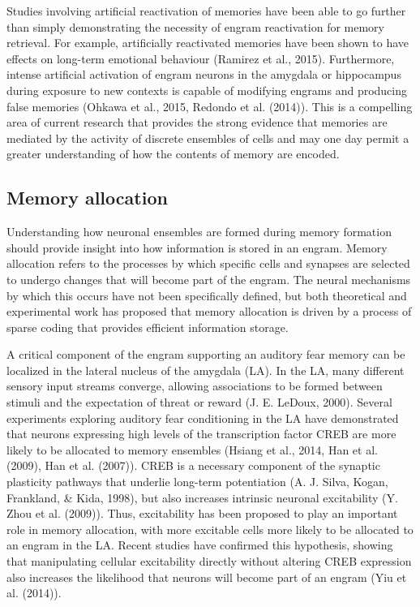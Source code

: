 \documentclass[12pt,a4paperpaper,]{report}
\begin{document}
Studies involving artificial reactivation of memories have been able to
go further than simply demonstrating the necessity of engram
reactivation for memory retrieval. For example, artificially reactivated
memories have been shown to have effects on long-term emotional
behaviour (Ramirez et al., 2015). Furthermore, intense artificial
activation of engram neurons in the amygdala or hippocampus during
exposure to new contexts is capable of modifying engrams and producing
false memories (Ohkawa et al., 2015, Redondo et al. (2014)). This is a
compelling area of current research that provides the strong evidence
that memories are mediated by the activity of discrete ensembles of
cells and may one day permit a greater understanding of how the contents
of memory are encoded.

\subsection{Memory allocation}\label{memory-allocation}

Understanding how neuronal ensembles are formed during memory formation
should provide insight into how information is stored in an engram.
Memory allocation refers to the processes by which specific cells and
synapses are selected to undergo changes that will become part of the
engram. The neural mechanisms by which this occurs have not been
specifically defined, but both theoretical and experimental work has
proposed that memory allocation is driven by a process of sparse coding
that provides efficient information storage.

A critical component of the engram supporting an auditory fear memory
can be localized in the lateral nucleus of the amygdala (LA). In the LA,
many different sensory input streams converge, allowing associations to
be formed between stimuli and the expectation of threat or reward (J. E.
LeDoux, 2000). Several experiments exploring auditory fear conditioning
in the LA have demonstrated that neurons expressing high levels of the
transcription factor CREB are more likely to be allocated to memory
ensembles (Hsiang et al., 2014, Han et al. (2009), Han et al. (2007)).
CREB is a necessary component of the synaptic plasticity pathways that
underlie long-term potentiation (A. J. Silva, Kogan, Frankland, \& Kida,
1998), but also increases intrinsic neuronal excitability (Y. Zhou et
al. (2009)). Thus, excitability has been proposed to play an important
role in memory allocation, with more excitable cells more likely to be
allocated to an engram in the LA. Recent studies have confirmed this
hypothesis, showing that manipulating cellular excitability directly
without altering CREB expression also increases the likelihood that
neurons will become part of an engram (Yiu et al. (2014)).
\end{document}
